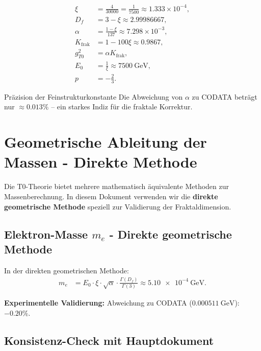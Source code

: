 	\begin{align}
		\xi &= \frac{4}{30000} = \frac{1}{7500} \approx 1.333 \times 10^{-4}, \label{eq:xi} \\
		D_f &= 3 - \xi \approx 2.99986667, \label{eq:Df} \\
		\alpha &= \frac{1 - \xi}{137} \approx 7.298 \times 10^{-3}, \label{eq:alpha} \\
		K_{\text{frak}} &= 1 - 100 \xi \approx 0.9867, \label{eq:K} \\
		g_{T0}^2 &= \alpha K_{\text{frak}}, \label{eq:gT0} \\
		E_0 &= \frac{1}{\xi} \approx \SI{7500}{\giga\electronvolt}, \label{eq:E0} \\
		p &= -\frac{2}{3}. \label{eq:p}
	\end{align}
	
	\begin{result}{Präzision der Feinstrukturkonstante}{}
		Die Abweichung von $\alpha$ zu CODATA beträgt nur $\approx 0.013\%$ -- ein starkes Indiz für die fraktale Korrektur.
	\end{result}
	
	\section{Geometrische Ableitung der Massen - Direkte Methode}
	\label{sec:geometrische_ableitung}
	
	Die T0-Theorie bietet mehrere mathematisch äquivalente Methoden zur Massenberechnung. In diesem Dokument verwenden wir die \textbf{direkte geometrische Methode} speziell zur Validierung der Fraktaldimension.
	
	\subsection{Elektron-Masse $m_e$ - Direkte geometrische Methode}
	\label{subsec:elektron_masse}
	
	In der direkten geometrischen Methode:
	\begin{align}
		m_e &= E_0 \cdot \xi \cdot \sqrt{\alpha} \cdot \frac{\Gamma(D_f)}{\Gamma(3)} \approx \SI{5.10e-4}{\giga\electronvolt}. \label{eq:me_direct}
	\end{align}
	
	\textbf{Experimentelle Validierung:} Abweichung zu CODATA ($\SI{0.000511}{\giga\electronvolt}$): $-0.20\%$.
	
	\subsection{Konsistenz-Check mit Hauptdokument}
	\label{subsec:konsistenz_check}
	
